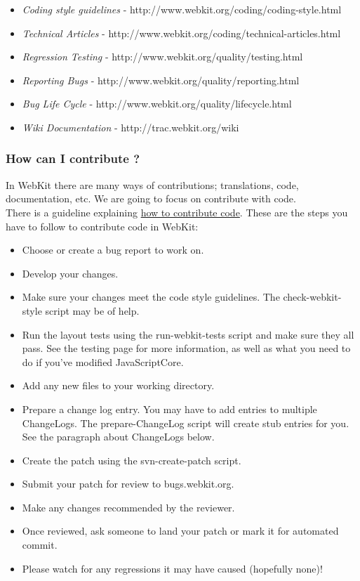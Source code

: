 \begin{itemize}
	\item \textit{Coding style guidelines} - http://www.webkit.org/coding/coding-style.html
	\item \textit{Technical Articles} - http://www.webkit.org/coding/technical-articles.html
	\item \textit{Regression Testing} - http://www.webkit.org/quality/testing.html
	\item \textit{Reporting Bugs} - http://www.webkit.org/quality/reporting.html
	\item \textit{Bug Life Cycle} - http://www.webkit.org/quality/lifecycle.html
	\item \textit{Wiki Documentation} - http://trac.webkit.org/wiki
\end{itemize}

\subsubsection{ How can I contribute ?} In WebKit there are many ways of contributions; translations, code, documentation, etc. We are going to focus on contribute with code.
\\ There is a guideline explaining \href{http://www.webkit.org/coding/contributing.html}{how to contribute code}. These are the steps you have to follow to contribute code in WebKit:
\begin{itemize}
	\item Choose or create a bug report to work on.
	\item Develop your changes.
	\item Make sure your changes meet the code style guidelines. The check-webkit-style script may be of help.
	\item Run the layout tests using the run-webkit-tests script and make sure they all pass. See the testing page for more information, as well as what you need to do if you've modified JavaScriptCore.
	\item Add any new files to your working directory.
	\item Prepare a change log entry. You may have to add entries to multiple ChangeLogs. The prepare-ChangeLog script will create stub entries for you. See the paragraph about ChangeLogs below.
	\item Create the patch using the svn-create-patch script.
	\item Submit your patch for review to bugs.webkit.org.
	\item Make any changes recommended by the reviewer.
	\item Once reviewed, ask someone to land your patch or mark it for automated commit.
	\item Please watch for any regressions it may have caused (hopefully none)!
\end{itemize}

